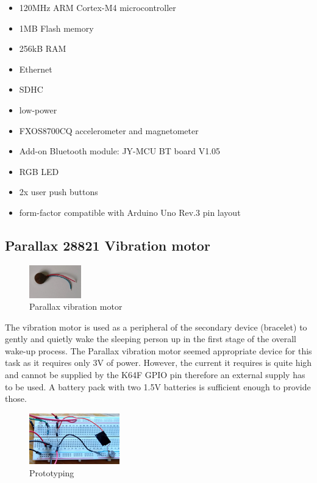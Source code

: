 \documentclass[12pt,a4paper]{article}
\begin{document}
		\begin{itemize}[topsep=4pt,itemsep=1pt]
			\item 120MHz ARM Cortex-M4 microcontroller
			\item 1MB Flash memory
			\item 256kB RAM
			\item Ethernet
			\item SDHC
			\item low-power
			\item FXOS8700CQ accelerometer and magnetometer 
			\item Add-on Bluetooth module: JY-MCU BT board V1.05
			\item RGB LED
			\item 2x user push buttons
			\item form-factor compatible with Arduino Uno Rev.3 pin layout
		\end{itemize}
		
		\subsection{Parallax 28821 Vibration motor}	
		\begin{figure}
			\centering
			\includegraphics[width=0.2\textwidth]{parallax_vib_mot1.jpg}
			\caption{Parallax vibration motor}
		\end{figure}
		
		The vibration motor is used as a peripheral of the secondary device (bracelet) to gently and quietly wake the sleeping person up in the first stage of the overall wake-up process. The Parallax vibration motor seemed appropriate device for this task as it requires only 3V of power. However, the current it requires is quite high and cannot be supplied by the K64F GPIO pin therefore an external supply has to be used. A battery pack with two 1.5V batteries is sufficient enough to provide those. 
		
        \begin{figure}
         \centering
         \includegraphics[width=0.35\textwidth]{circuit_proto.jpg}
         \caption{Prototyping}
        \end{figure}
        
\end{document}
